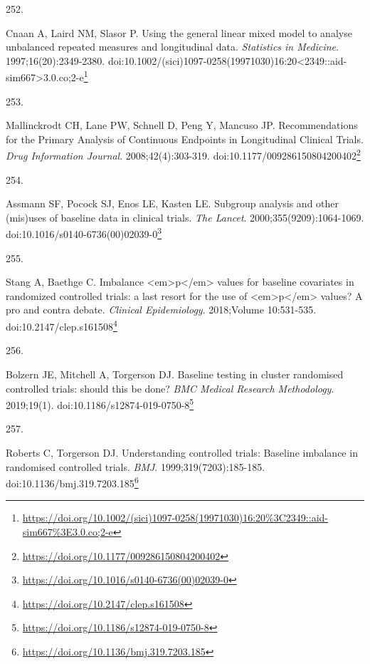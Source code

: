 \documentclass[
  a4paper,
]{book}
\newlength{\cslhangindent}
\newlength{\csllabelwidth}
\newlength{\cslentryspacingunit} %
\newenvironment{CSLReferences}[2] %
 {%
  \setlength{\parindent}{0pt}
  \ifodd #1
  \let\oldpar\par
  \def\par{\hangindent=\cslhangindent\oldpar}
  \fi
  \setlength{\parskip}{#2\cslentryspacingunit}
 }%
 {}
\newcommand{\CSLLeftMargin}[1]{\parbox[t]{\csllabelwidth}{#1}}
\newcommand{\CSLRightInline}[1]{\parbox[t]{\linewidth - \csllabelwidth}{#1}\break}
\renewcommand{\href}[2]{#2\footnote{\url{#1}}}
\begin{document}
\begin{CSLReferences}{0}{0}
\leavevmode{}%
\CSLLeftMargin{252. }%
\CSLRightInline{Cnaan A, Laird NM, Slasor P. Using the general linear mixed model to analyse unbalanced repeated measures and longitudinal data. \emph{Statistics in Medicine}. 1997;16(20):2349-2380. doi:\href{https://doi.org/10.1002/(sici)1097-0258(19971030)16:20\%3C2349::aid-sim667\%3E3.0.co;2-e}{10.1002/(sici)1097-0258(19971030)16:20\textless2349::aid-sim667\textgreater3.0.co;2-e}}

\leavevmode{}%
\CSLLeftMargin{253. }%
\CSLRightInline{Mallinckrodt CH, Lane PW, Schnell D, Peng Y, Mancuso JP. Recommendations for the Primary Analysis of Continuous Endpoints in Longitudinal Clinical Trials. \emph{Drug Information Journal}. 2008;42(4):303-319. doi:\href{https://doi.org/10.1177/009286150804200402}{10.1177/009286150804200402}}

\leavevmode{}%
\CSLLeftMargin{254. }%
\CSLRightInline{Assmann SF, Pocock SJ, Enos LE, Kasten LE. Subgroup analysis and other (mis)uses of baseline data in clinical trials. \emph{The Lancet}. 2000;355(9209):1064-1069. doi:\href{https://doi.org/10.1016/s0140-6736(00)02039-0}{10.1016/s0140-6736(00)02039-0}}

\leavevmode{}%
\CSLLeftMargin{255. }%
\CSLRightInline{Stang A, Baethge C. Imbalance \textless em\textgreater p\textless/em\textgreater{} values for baseline covariates in randomized controlled trials: a last resort for the use of \textless em\textgreater p\textless/em\textgreater{} values? A pro and contra debate. \emph{Clinical Epidemiology}. 2018;Volume 10:531-535. doi:\href{https://doi.org/10.2147/clep.s161508}{10.2147/clep.s161508}}

\leavevmode{}%
\CSLLeftMargin{256. }%
\CSLRightInline{Bolzern JE, Mitchell A, Torgerson DJ. Baseline testing in cluster randomised controlled trials: should this be done? \emph{BMC Medical Research Methodology}. 2019;19(1). doi:\href{https://doi.org/10.1186/s12874-019-0750-8}{10.1186/s12874-019-0750-8}}

\leavevmode{}%
\CSLLeftMargin{257. }%
\CSLRightInline{Roberts C, Torgerson DJ. Understanding controlled trials: Baseline imbalance in randomised controlled trials. \emph{BMJ}. 1999;319(7203):185-185. doi:\href{https://doi.org/10.1136/bmj.319.7203.185}{10.1136/bmj.319.7203.185}}


\end{CSLReferences}
\end{document}
